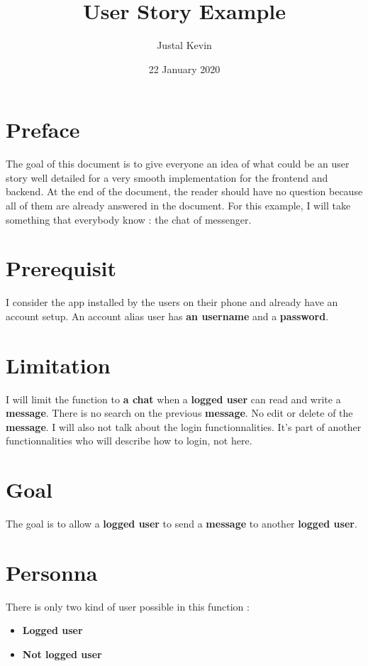 \documentclass[11pt]{article}
\title{\textbf{User Story Example}}
\author{Justal Kevin}
\date{22 January 2020}
\begin{document}
\maketitle
\thispagestyle{empty}

\section{Preface}
The goal of this document is to give everyone an idea of what could be an user story well detailed for a very smooth implementation for the frontend and backend. At the end of the document, the reader should have no question because all of them are already answered in the document. For this example, I will take something that everybody know : the chat of messenger.\\

\section{Prerequisit}
I consider the app installed by the users on their phone and already have an account setup. An account alias user has \textbf{an username} and a \textbf{password}.

\section{Limitation}
I will limit the function to \textbf{a chat} when a \textbf{logged user} can read and write a \textbf{message}. There is no search on the previous \textbf{message}. No edit or delete of the \textbf{message}. I will also not talk about the login functionnalities. It's part of another functionnalities who will describe how to login, not here.

\section{Goal}
The goal is to allow a \textbf{logged user} to send a \textbf{message} to another \textbf{logged user}.

\section{Personna}

There is only two kind of user possible in this function :

\begin{itemize}
  \item \textbf{Logged user}
  \item \textbf{Not logged user}
\end{itemize}
\end{document}
